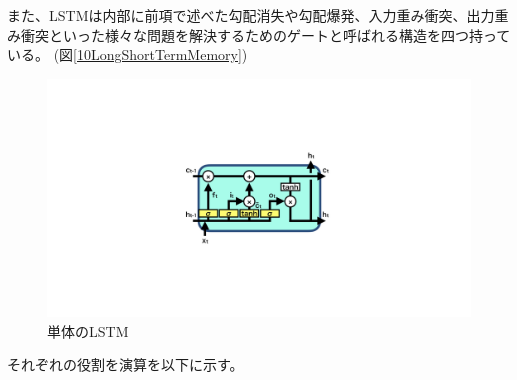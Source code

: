 また、LSTMは内部に前項で述べた勾配消失や勾配爆発、入力重み衝突、出力重み衝突といった様々な問題を解決するためのゲートと呼ばれる構造を四つ持っている。 (図\ref{10LongShortTermMemory})


\begin{figure}[h]
 \centering
 \includegraphics[trim = 0 300 0 300, width=1.0\textwidth, clip]{Figure/2DeepLearning/11LSTM.png}
 \caption{単体のLSTM}
 \label{11LSTM}
\end{figure}


それぞれの役割を演算を以下に示す。

